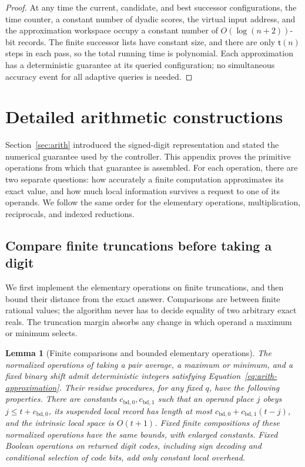 \documentclass[11pt]{article}
\numberwithin{equation}{section}
\newtheorem{lemma}[theorem]{Lemma}
\theoremstyle{definition}
\theoremstyle{remark}
\begin{document}
\begin{proof}
At any time the current, candidate, and best successor configurations,
the time counter, a constant number of dyadic scores, the virtual
input address, and the approximation workspace occupy a constant
number of $O(\log(n+2))$-bit records. The finite successor lists
have constant size, and there are only ${\mathsf{t}}(n)$ steps in each pass,
so the total running time is polynomial. Each approximation has a
deterministic guarantee at its queried configuration; no simultaneous
accuracy event for all adaptive queries is needed.
\end{proof}





\appendix

\section{Detailed arithmetic constructions}

Section~\ref{sec:arith} introduced the signed-digit representation and stated the numerical guarantee used by the controller. This appendix proves the primitive operations from which that guarantee is assembled. For each operation, there are two separate questions: how accurately a finite computation approximates its exact value, and how much local information survives a request to one of its operands. We follow the same order for the elementary operations, multiplication, reciprocals, and indexed reductions.

\subsection{Compare finite truncations before taking a digit}

We first implement the elementary operations on finite truncations, and then bound their distance from the exact answer. Comparisons are between finite rational values; the algorithm never has to decide equality of two arbitrary exact reals. The truncation margin absorbs any change in which operand a maximum or minimum selects.


\begin{lemma}[Finite comparisons and bounded elementary operations]
\label{lem:arith-elementary}
The normalized operations of taking a pair average, a maximum or
minimum, and a fixed binary shift admit deterministic integers
satisfying Equation~\eqref{eq:arith-approximation}.  Their residue
procedures, for any fixed $q$, have the following properties.  There
are constants ${c_{\mathrm{bd},0}},{c_{\mathrm{bd},1}}$ such that an operand place $j$ obeys
$j\leq t+{c_{\mathrm{bd},0}}$, its suspended local record has length at most
${c_{\mathrm{bd},0}}+{c_{\mathrm{bd},1}}(t-j)$, and the intrinsic local space is $O(t+1)$.
Fixed finite compositions of these normalized operations have the
same bounds, with enlarged constants.  Fixed Boolean operations on
returned digit codes, including sign decoding and conditional selection
of code bits, add only constant local overhead.
\end{lemma}
\end{document}
